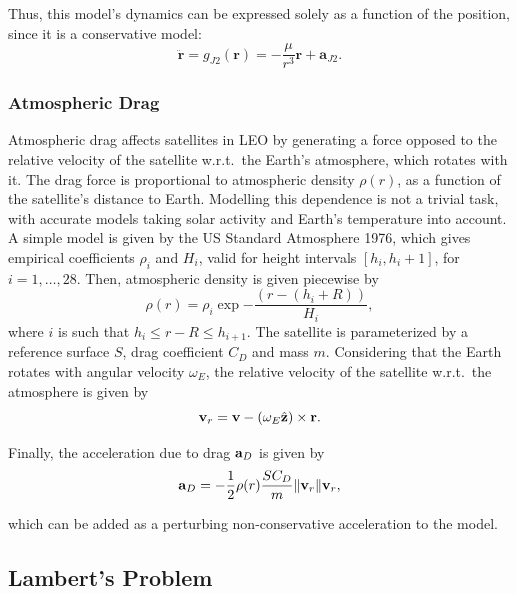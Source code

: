 Thus, this model's dynamics can be expressed solely as a function of the position, since it is a conservative model:
\begin{equation}
    \ddot{\mathbf{r}} = g_{J2}(\mathbf{r}) = -\frac{\mu}{r^3} \mathbf{r} + \mathbf{a}_{J2}.
\end{equation}

\subsubsection{Atmospheric Drag}

Atmospheric drag affects satellites in LEO by generating a force opposed to the relative velocity of the satellite w.r.t.\ the Earth's atmosphere, which rotates with it. The drag force is proportional to atmospheric density \(\rho(r)\), as a function of the satellite's distance to Earth. Modelling this dependence is not a trivial task, with accurate models taking solar activity and Earth's temperature into account. A simple model is given by the US Standard Atmosphere 1976, which gives empirical coefficients \(\rho_i\) and \(H_i\), valid for height intervals \([h_i, h_i+1]\), for \(i = 1,\dots, 28\). Then, atmospheric density is given piecewise by
\begin{equation}
    \rho(r) = \rho_i \exp{-\frac{\left(r - (h_i + R)\right)}{H_i}},
\end{equation}
where \(i\) is such that \(h_i \leq r - R \leq h_{i+1}\). The satellite is parameterized by a reference surface \(S\), drag coefficient \(C_D\) and mass \(m\). Considering that the Earth rotates with angular velocity \(\omega_E\), the relative velocity of the satellite w.r.t.\ the atmosphere is given by
\begin{equation}
    \mathbf{v}_{r} = \mathbf{v} - (\omega_E \hat{\mathbf{z}}) \times \mathbf{r}.
\end{equation}

Finally, the acceleration due to drag \(\mathbf{a}_D\) is given by
\begin{equation}\label{eq:acc_drag}
    \acc_D = - \frac{1}{2} \rho(r) \frac{S C_D}{m} \lVert \vel_r \rVert \vel_r,
\end{equation}

which can be added as a perturbing non-conservative acceleration to the model.

\subsection{Lambert's Problem}


